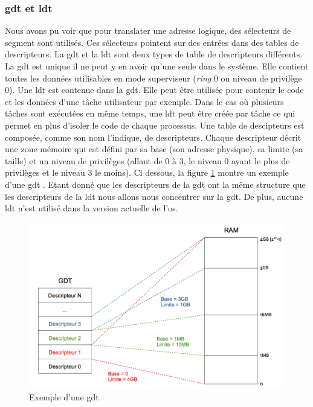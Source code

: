 \subsubsection{\acrshort{gdt} et \acrshort{ldt}}
Nous avons pu voir que pour translater une adresse logique, des sélecteurs de
segment sont utilisés. Ces sélecteurs pointent sur des entrées dans des tables
de descripteurs. La \acrshort{gdt} et la \acrshort{ldt} sont deux types de table 
de descripteurs différents. La \acrshort{gdt} est unique il ne peut y en avoir
qu'une seule dans le système. Elle contient toutes les données utilisables en mode
superviseur (\textit{ring} 0 ou niveau de privilège 0). Une \acrshort{ldt} est
contenue dans la \acrshort{gdt}. Elle peut être utilisée pour contenir le code
et les données d'une tâche utilisateur par exemple. Dans le cas où plusieurs tâches
sont exécutées en même temps, une \acrshort{ldt} peut être créée par tâche ce qui
permet en plus d'isoler le code de chaque processus. Une table de descipteurs
est composée, comme son nom l'indique, de descripteurs. Chaque descripteur décrit
une zone mémoire qui est défini par sa base (son adresse physique), sa limite (sa taille)
et un niveau de privilèges (allant de 0 à 3, le niveau 0 ayant le plus de privilèges
et le niveau 3 le moins). Ci dessous, la figure \ref{gdt} montre un exemple d'une
\acrshort{gdt} \cite{ref42}. Etant donné que les descripteurs de la \acrshort{gdt}
ont la même structure que les descripteurs de la \acrshort{ldt} nous allons nous
concentrer sur la \acrshort{gdt}. De plus, aucune \acrshort{ldt} n'est utilisé dans
la version actuelle de l'\acrshort{os}. \\

\begin{figure}[!h]
  \centering
  \includegraphics[scale=0.75]{images/gdt.png}
  \caption{Exemple d'une \acrshort{gdt}}
  \label{gdt}
\end{figure}

